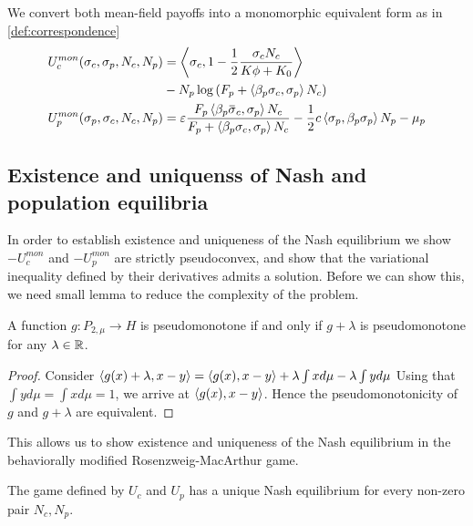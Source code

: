 We convert both mean-field payoffs into a monomorphic equivalent form as in \cref{def:correspondence}
\begin{align}
  \label{eq:mon_eq_forms}
  U_c^{mon}(\sigma_c, \sigma_p, N_c, N_p) &= \ip{\sigma_c}{1-\frac{1}{2}\frac{\sigma_c N_c}{K\phi + K_0}}\\ &- N_p\log\pa{F_p + \ip{\beta_p \sigma_c}{\sigma_p} N_c} \\
  U_p^{mon}(\sigma_p, \sigma_c, N_c, N_p) &= \epsilon \frac{F_p \ip{\beta_p \overbar{\sigma}_c}{\sigma_p} N_c}{F_p + \ip{\beta_p \sigma_c}{\sigma_p} N_c} - \frac{1}{2}c \ip{\sigma_p}{\beta_p \sigma_p}N_p  - \mu_p
\end{align}
\subsection{Existence and uniquenss of Nash and population equilibria}
In order to establish existence and uniqueness of the Nash equilibrium we show $-U_c^{mon}$ and $-U_p^{mon}$ are strictly pseudoconvex, and show that the variational inequality defined by their derivatives admits a solution. Before we can show this, we need small lemma to reduce the complexity of the problem.
\begin{lemma}
  \label{lem:pseudo_reduc}
  A function $g: P_{2,\mu} \to H$ is pseudomonotone if and only if $g+\lambda$ is pseudomonotone for any $\lambda \in \mathbb{R}$.
\end{lemma}
\begin{proof}
  Consider $\left \langle g(x)+\lambda,x-y \right \rangle=\left \langle g(x),x-y \right \rangle+\lambda \int x d\mu - \lambda \int y d\mu$
  Using that $\int y d\mu = \int x d\mu = 1$, we arrive at  $\left \langle g(x),x-y \right \rangle$.
  Hence the pseudomonotonicity of $g$ and $g+\lambda$ are equivalent.
\end{proof}
This allows us to show existence and uniqueness of the Nash equilibrium in the behaviorally modified Rosenzweig-MacArthur game.
\begin{proposition}
  \label{prop:exist_unique_nash}
  The game defined by $U_c$ and $U_p$ has a unique Nash equilibrium for every non-zero pair $N_c,N_p$.
\end{proposition}
